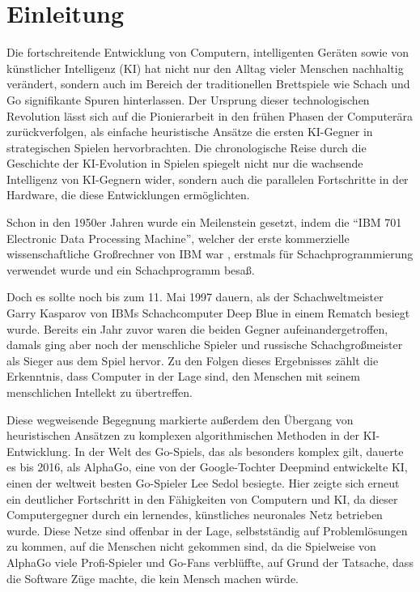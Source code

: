 \chapter{Einleitung}
\label{chapter:einleitung}

Die fortschreitende Entwicklung von Computern, intelligenten Geräten sowie von künstlicher Intelligenz (\acs{KI}) hat nicht nur den Alltag vieler Menschen nachhaltig verändert, sondern auch im Bereich der traditionellen Brettspiele wie Schach und Go signifikante Spuren hinterlassen. Der Ursprung dieser technologischen Revolution lässt sich auf die Pionierarbeit in den frühen Phasen der Computerära zurückverfolgen, als einfache heuristische Ansätze die ersten \acs{KI}-Gegner in strategischen Spielen hervorbrachten. Die chronologische Reise durch die Geschichte der \acs{KI}-Evolution in Spielen spiegelt nicht nur die wachsende Intelligenz von \acs{KI}-Gegnern wider, sondern auch die parallelen Fortschritte in der Hardware, die diese Entwicklungen ermöglichten.

Schon in den 1950er Jahren wurde ein Meilenstein gesetzt, indem die \enquote{\acs{IBM} 701 Electronic Data Processing Machine}, welcher der erste kommerzielle wissenschaftliche Großrechner von \ac{IBM} war \cite{2023.IBM701}, erstmals für Schachprogrammierung verwendet wurde und ein Schachprogramm besaß. \cite{2014.EndeDerBescheidenheit}

Doch es sollte noch bis zum 11. Mai 1997 dauern, als der Schachweltmeister Garry Kasparov von \ac{IBM}s Schachcomputer Deep Blue in einem Rematch besiegt wurde. Bereits ein Jahr zuvor waren die beiden Gegner aufeinandergetroffen, damals ging aber noch der menschliche Spieler und russische Schachgroßmeister als Sieger aus dem Spiel hervor. Zu den Folgen dieses Ergebnisses zählt die Erkenntnis, dass Computer in der Lage sind, den Menschen mit seinem menschlichen Intellekt zu übertreffen. \cite{2022.DeepBlue}

Diese wegweisende Begegnung markierte außerdem den Übergang von heuristischen Ansätzen zu komplexen algorithmischen Methoden in der \acs{KI}-Entwicklung. In der Welt des Go-Spiels, das als besonders komplex gilt, dauerte es bis 2016, als AlphaGo, eine von der Google-Tochter Deepmind entwickelte \ac{KI}, einen der weltweit besten Go-Spieler Lee Sedol besiegte. Hier zeigte sich erneut ein deutlicher Fortschritt in den Fähigkeiten von Computern und \ac{KI}, da dieser Computergegner durch ein lernendes, künstliches neuronales Netz betrieben wurde. Diese Netze sind offenbar in der Lage, selbstständig auf Problemlösungen zu kommen, auf die Menschen nicht gekommen sind, da die Spielweise von AlphaGo viele Profi-Spieler und Go-Fans verblüffte, auf Grund der Tatsache, dass die Software Züge machte, die kein Mensch machen würde. \cite{2016.AlphaGo}


